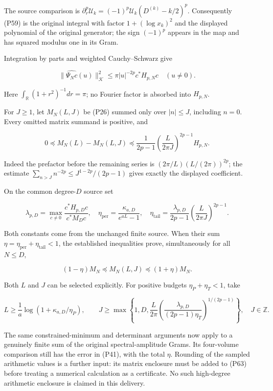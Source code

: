 The source comparison is \(\partial_r^p\mathcal U_k=(-1)^p\mathcal U_k(D^{(k)}-k/2)^p\). Consequently (P59) is the original integral with factor \(1+(\log x_k)^2\) and the displayed polynomial of the original generator; the sign \((-1)^p\) appears in the map and has squared modulus one in its Gram.

Integration by parts and weighted Cauchy--Schwarz give

\[
\|\widehat{\Psi_Nc}(u)\|_{\mathcal K}^2
\le \pi |u|^{-2p}c^*H_{p,N}c\quad(u\ne0).
\tag{P60}
\]

Here \(\int_{\mathbb R}(1+r^2)^{-1}dr=\pi\); no Fourier factor is absorbed into \(H_{p,N}\).

For \(J\ge1\), let \(M_N(L,J)\) be (P26) summed only over \(|n|\le J\), including \(n=0\). Every omitted matrix summand is positive, and

\[
\boxed{
0\preceq M_N(L)-M_N(L,J)
\preceq\frac1{2p-1}
\left(\frac{L}{2\pi J}\right)^{2p-1}H_{p,N}.}
\tag{P61}
\]

Indeed the prefactor before the remaining series is \((2\pi/L)(L/(2\pi))^{2p}\); the estimate \(\sum_{n>J}n^{-2p}\le J^{1-2p}/(2p-1)\) gives exactly the displayed coefficient.

On the common degree-\(D\) source set

\[
\lambda_{p,D}=\max_{c\ne0}\frac{c^*H_{p,D}c}{c^*M_Dc},\quad
\eta_{\mathrm{per}}=\frac{\kappa_{a,D}}{e^{aL}-1},\quad
\eta_{\mathrm{tail}}=\frac{\lambda_{p,D}}{2p-1}
\left(\frac{L}{2\pi J}\right)^{2p-1}.
\tag{P62}
\]

Both constants come from the unchanged finite source. When their sum \(\eta=\eta_{\mathrm{per}}+\eta_{\mathrm{tail}}<1\), the established inequalities prove, simultaneously for all \(N\le D\),

\[
(1-\eta)M_N\preceq M_N(L,J)\preceq(1+\eta)M_N.
\tag{P63}
\]

Both \(L\) and \(J\) can be selected explicitly. For positive budgets \(\eta_P+\eta_T<1\), take

\[
L\ge\frac1a\log(1+\kappa_{a,D}/\eta_P),\qquad
J\ge\max\left\{1,D,
\frac L{2\pi}
\left(\frac{\lambda_{p,D}}{(2p-1)\eta_T}\right)^{1/(2p-1)}
\right\},\quad J\in\mathbb Z.
\tag{P64}
\]

The same constrained-minimum and determinant arguments now apply to a genuinely finite sum of the original spectral-amplitude Grams. Its four-volume comparison still has the error in (P41), with the total \(\eta\). Rounding of the sampled arithmetic values is a further input: its matrix enclosure must be added to (P63) before treating a numerical calculation as a certificate. No such high-degree arithmetic enclosure is claimed in this delivery.

